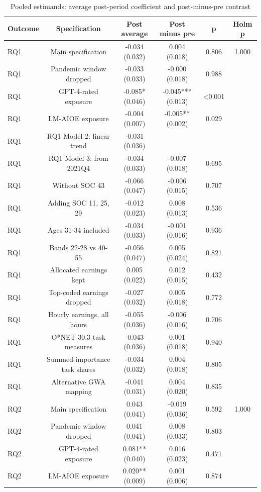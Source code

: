 \begin{table}[htbp]\centering
\caption{Pooled estimands: average post-period coefficient and post-minus-pre contrast}
\begin{tabular}{lccccc}
\toprule
Outcome & Specification & Post average & Post minus pre & p & Holm p \\
\midrule
RQ1 & Main specification & -0.034 (0.032) & 0.004 (0.018) & 0.806 & 1.000 \\
RQ1 & Pandemic window dropped & -0.033 (0.033) & -0.000 (0.018) & 0.988 &  \\
RQ1 & GPT-4-rated exposure & -0.085* (0.046) & -0.045*** (0.013) & <0.001 &  \\
RQ1 & LM-AIOE exposure & -0.004 (0.007) & -0.005** (0.002) & 0.029 &  \\
RQ1 & RQ1 Model 2: linear trend & -0.031 (0.036) &  &  &  \\
RQ1 & RQ1 Model 3: from 2021Q4 & -0.034 (0.033) & -0.007 (0.018) & 0.695 &  \\
RQ1 & Without SOC 43 & -0.066 (0.047) & -0.006 (0.015) & 0.707 &  \\
RQ1 & Adding SOC 11, 25, 29 & -0.012 (0.023) & 0.008 (0.013) & 0.536 &  \\
RQ1 & Ages 31-34 included & -0.034 (0.033) & -0.001 (0.016) & 0.936 &  \\
RQ1 & Bands 22-28 vs 40-55 & -0.056 (0.047) & 0.005 (0.024) & 0.821 &  \\
RQ1 & Allocated earnings kept & 0.005 (0.022) & 0.012 (0.015) & 0.432 &  \\
RQ1 & Top-coded earnings dropped & -0.027 (0.032) & 0.005 (0.018) & 0.772 &  \\
RQ1 & Hourly earnings, all hours & -0.055 (0.036) & -0.006 (0.016) & 0.706 &  \\
RQ1 & O*NET 30.3 task measures & -0.043 (0.036) & 0.001 (0.018) & 0.940 &  \\
RQ1 & Summed-importance task shares & -0.034 (0.032) & 0.004 (0.018) & 0.805 &  \\
RQ1 & Alternative GWA mapping & -0.041 (0.031) & 0.004 (0.020) & 0.835 &  \\
RQ2 & Main specification & 0.043 (0.041) & -0.019 (0.036) & 0.592 & 1.000 \\
RQ2 & Pandemic window dropped & 0.041 (0.041) & 0.008 (0.033) & 0.803 &  \\
RQ2 & GPT-4-rated exposure & 0.081** (0.040) & 0.016 (0.023) & 0.471 &  \\
RQ2 & LM-AIOE exposure & 0.020** (0.009) & 0.001 (0.006) & 0.874 &  \\

\end{tabular}
\end{table}
